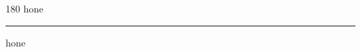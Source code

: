 
\begin{frame}
\begin{center}
\begin{turn}{180}
{\fontsize{2.5cm}{1em}\selectfont hone}
\end{turn}
\vspace{1em}\par  
\hrule
\vspace{1em}\par  
{\fontsize{2.5cm}{1em}\selectfont hone}
\end{center}
\end{frame}
